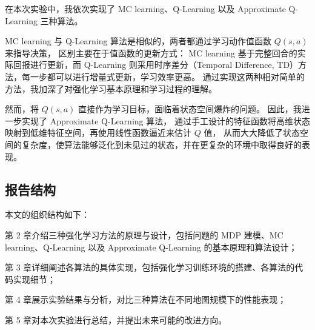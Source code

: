 在本次实验中，我依次实现了 MC learning、Q-Learning 以及 Approximate Q-Learning 三种算法。

MC learning 与 Q-Learning 算法是相似的，两者都通过学习动作值函数 $Q(s,a)$ 来指导决策，
区别主要在于值函数的更新方式：
MC learning 基于完整回合的实际回报进行更新，而 Q-Learning 则采用时序差分（Temporal Difference, TD）方法，每一步都可以进行增量式更新，学习效率更高。
通过实现这两种相对简单的方法，我加深了对强化学习基本原理和学习过程的理解。

然而，将 $Q(s,a)$ 直接作为学习目标，面临着状态空间爆炸的问题。
因此，我进一步实现了 Approximate Q-Learning 算法，
通过手工设计的特征函数将高维状态映射到低维特征空间，再使用线性函数逼近来估计 $Q$ 值，
从而大大降低了状态空间的复杂度，使算法能够泛化到未见过的状态，并在更复杂的环境中取得良好的表现。


\subsection{报告结构}

本文的组织结构如下：

第 2 章介绍三种强化学习方法的原理与设计，包括问题的 MDP 建模、MC learning、Q-Learning 以及 Approximate Q-Learning 的基本原理和算法设计；

第 3 章详细阐述各算法的具体实现，包括强化学习训练环境的搭建、各算法的代码实现细节；

第 4 章展示实验结果与分析，对比三种算法在不同地图规模下的性能表现；

第 5 章对本次实验进行总结，并提出未来可能的改进方向。